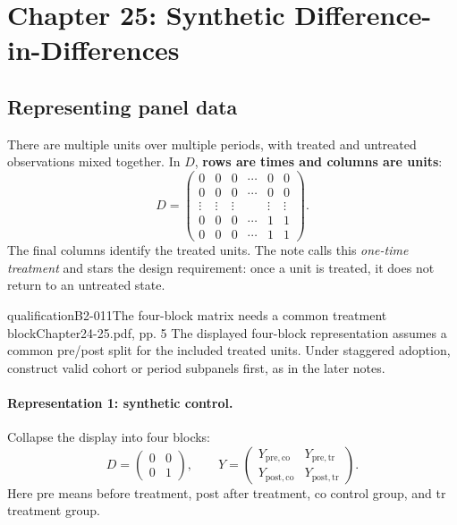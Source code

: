 \section{Chapter 25: Synthetic Difference-in-Differences}
\subsection{Representing panel data}
There are multiple units over multiple periods, with treated and untreated observations mixed together. In \(D\), \textbf{rows are times and columns are units}:
\[
D=\begin{pmatrix}
0&0&0&\cdots&0&0\\
0&0&0&\cdots&0&0\\
\vdots&\vdots&\vdots&&\vdots&\vdots\\
0&0&0&\cdots&1&1\\
0&0&0&\cdots&1&1
\end{pmatrix}.
\]
The final columns identify the treated units.
 The note calls this \emph{one-time treatment} and stars the design requirement: once a unit is treated, it does not return to an untreated state.
\begin{reviewnote}{qualification}{B2-011}{The four-block matrix needs a common treatment block}{Chapter24-25.pdf, pp. 5}
The displayed four-block representation assumes a common pre/post split for the included treated units. Under staggered adoption, construct valid cohort or period subpanels first, as in the later notes.
\par{}
\end{reviewnote}


\paragraph{Representation 1: synthetic control.}
Collapse the display into four blocks:
\[
D=\begin{pmatrix}0&0\\0&1\end{pmatrix},\qquad
Y=\begin{pmatrix}
Y_{\mathrm{pre,co}}&Y_{\mathrm{pre,tr}}\\
Y_{\mathrm{post,co}}&Y_{\mathrm{post,tr}}
\end{pmatrix}.
\]
Here pre means before treatment, post after treatment, co control group, and tr treatment group.
